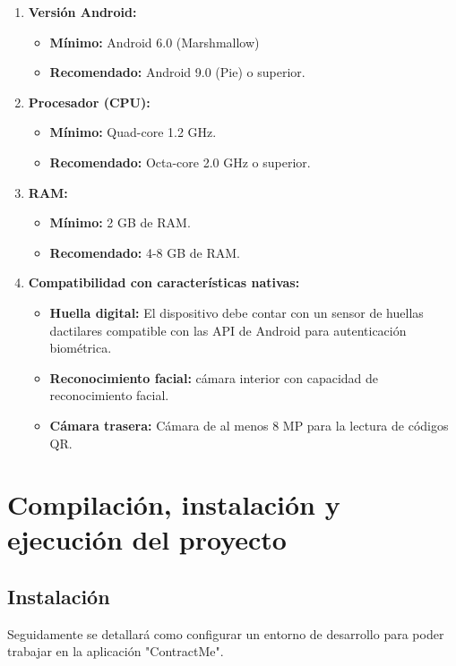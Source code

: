 \begin{enumerate}

\item\textbf{Versión Android:}
	\begin{itemize}
	\item\textbf{Mínimo:}  Android 6.0 (Marshmallow)
	\item\textbf{Recomendado:} Android 9.0 (Pie) o superior.
	\end{itemize}
	
\item\textbf{Procesador (CPU):}
	\begin{itemize}
	\item\textbf{Mínimo:} Quad-core 1.2 GHz.
	\item\textbf{Recomendado:} Octa-core 2.0 GHz o superior.
	\end{itemize}
	
\item\textbf{RAM:}
	\begin{itemize}
	\item\textbf{Mínimo:} 2 GB de RAM.
	\item\textbf{Recomendado:} 4-8 GB de RAM.
	\end{itemize}
	
\item\textbf{Compatibilidad con características nativas:}
	\begin{itemize}
	\item\textbf{Huella digital:} El dispositivo debe contar con un sensor de huellas dactilares compatible con
	las API de Android para autenticación biométrica.
	\item\textbf{Reconocimiento facial:} cámara interior con capacidad de reconocimiento facial.
	\item\textbf{Cámara trasera:} Cámara de al menos 8 MP para la lectura de códigos QR.
	\end{itemize}

\end{enumerate}


\section{Compilación, instalación y ejecución del proyecto}

\subsection{Instalación}

Seguidamente se detallará como configurar un entorno de desarrollo para poder trabajar en la aplicación "ContractMe".

